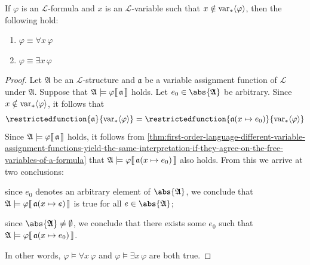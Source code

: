 \begin{thm}
     \label{logical-equivalence:quantification-of-a-formula-with-a-non-free-variable-is-equivalent-to-the-original-formula}
    If \( \varphi \) is an \( \mathcal{L} \)-formula and \( x \) is an \( \mathcal{L} \)-variable such that \( x \notin \operatorname{var}_{\ast} \langle\varphi\rangle \),
    then the following hold:
    \begin{enumerate}[topsep=2pt,label=\textup{\texttt{(\alph*)}}]
        \item \( \varphi \equiv \forall x \, \varphi \)
        \item \( \varphi \equiv \exists x \, \varphi \)
    \end{enumerate}
\end{thm}

\begin{proof}
    Let \( \mathfrak{A} \) be an \( \mathcal{L} \)-structure and \( \mathfrak{a} \) be a variable assignment function of \( \mathcal{L} \) under \( \mathfrak{A} \).
    Suppose that \(  \mathfrak{A} \models \varphi\llbracket\, \mathfrak{a} \,\rrbracket \) holds.
    Let \( e_{0} \in \abs{\mathfrak{A}} \) be arbitrary.
    Since \( x \notin \operatorname{var}_{\ast} \langle\varphi\rangle \), it follows that
    \begin{equation*}
        \restrictedfunction{ \mathfrak{a} }{ \folfreevars{\varphi} } =
        \restrictedfunction{ \folmodifiedvariableassignmentfunction{\mathfrak{a}}{x}{e_{0}} }{ \folfreevars{\varphi} }
    \end{equation*}
    Since \(  \mathfrak{A} \models \varphi\llbracket\, \mathfrak{a} \,\rrbracket \) holds, it follows from
    \cref{thm:first-order-language-different-variable-assignment-functions-yield-the-same-interpretation-if-they-agree-on-the-free-variables-of-a-formula}
    that \( \folwffsatisfaction{\mathfrak{A}}{\varphi}{ \folmodifiedvariableassignmentfunction{\mathfrak{a}}{x}{e_{0}} } \) also holds.
    From this we arrive at two conclusions:
    \begin{enumerate*}[label=(\roman*)]
        \item since \( e_{0} \) denotes an arbitrary element of \( \abs{\mathfrak{A}} \), we conclude that
            \( \folwffsatisfaction{\mathfrak{A}}{\varphi}{ \folmodifiedvariableassignmentfunction{\mathfrak{a}}{x}{e} } \) is true for all \( e \in \abs{\mathfrak{A}} \);
        \item since \( \abs{\mathfrak{A}} \neq \emptyset \), we conclude that there exists some \( e_{0} \) such that
            \( \folwffsatisfaction{\mathfrak{A}}{\varphi}{ \folmodifiedvariableassignmentfunction{\mathfrak{a}}{x}{e_{0}} } \).
    \end{enumerate*}
    In other words, \( \varphi \models \forall x \, \varphi \) and \( \varphi \models \exists x \, \varphi \) are both true.


\end{proof}

